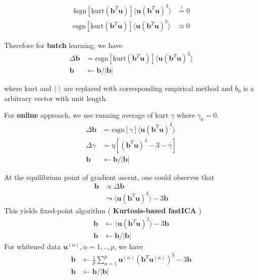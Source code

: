 \begin{align*}
	4\text{sgn}[ \text{kurt}(\boldsymbol{b}^T\boldsymbol{u}) ] \langle \boldsymbol{u}(\boldsymbol{b}^T \boldsymbol{u})^3 \rangle 
	&\stackrel{!}{=} 0 \\
	\epsilon	\text{sgn}[ \text{kurt}(\boldsymbol{b}^T\boldsymbol{u}) ] \langle \boldsymbol{u}(\boldsymbol{b}^T \boldsymbol{u})^3 \rangle 
		&\approx 0
\end{align*}

Therefore for \textbf{batch} learning, we have 
\begin{align*}
	\Delta \boldsymbol{b} &= \epsilon	\text{sgn}[ \text{kurt}(\boldsymbol{b}^T\boldsymbol{u}) ] \langle \boldsymbol{u}(\boldsymbol{b}^T \boldsymbol{u})^3 \rangle  \\
	\boldsymbol{b} &\leftarrow \boldsymbol{b} / |\boldsymbol{b}|
\end{align*}

where kurt and $\langle \cdot \rangle$ are replaced with corresponding empirical method and $b_0$ is a arbitrary vector with unit length.

For \textbf{online} approach, we use running average of kurt $\gamma$ where $\gamma_0 = 0$.
\begin{align*}
\Delta \boldsymbol{b} &= \epsilon	\text{sgn}[ \gamma ] \langle \boldsymbol{u}(\boldsymbol{b}^T \boldsymbol{u})^3 \rangle  \\
\Delta \gamma &= \eta[ (\boldsymbol{b}^T \boldsymbol{u} ) ^4 -3 -\gamma] \\
	\boldsymbol{b} &\leftarrow \boldsymbol{b} / |\boldsymbol{b}|	
\end{align*}

At the equilibrium point of gradient ascent, one could observes that  
\begin{align*}
\boldsymbol{b} &\propto \Delta \boldsymbol{b}  \\
&\leadsto \langle \boldsymbol{u}(\boldsymbol{b}^T \boldsymbol{u})^3 \rangle - 3\boldsymbol{b}
\end{align*}
This yields fixed-point algorithm ( \textbf{Kurtosis-based fastICA}   )
\begin{align*}
	\boldsymbol{b} &\leftarrow \langle \boldsymbol{u}(\boldsymbol{b}^T\boldsymbol{u})^3 \rangle - 3\boldsymbol{b} \\
	\boldsymbol{b} &\leftarrow \boldsymbol{b}/|\boldsymbol{b}|
\end{align*}
For whitened data $\boldsymbol{u}^{(\alpha)}, \alpha=1,..,p$, we have 
\begin{align*}
	\boldsymbol{b} &\leftarrow  \frac{1}{p} \sum_{\alpha=1}^{p}\boldsymbol{u}^{(\alpha)}(\boldsymbol{b}^T\boldsymbol{u}^{(\alpha)})^3 - 3\boldsymbol{b} \\
	\boldsymbol{b} &\leftarrow \boldsymbol{b}/|\boldsymbol{b}|
\end{align*}

